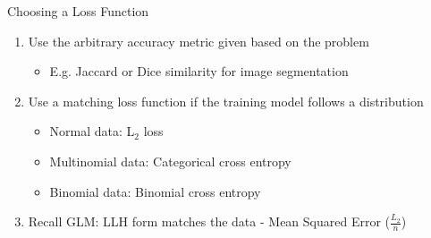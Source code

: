 \documentclass[aspectratio=169]{beamer}
\begin{document}
%
\begin{frame}{Choosing a Loss Function}

\begin{enumerate}
\item Use the arbitrary accuracy metric given based on the problem
	\begin{itemize}
	\item E.g. Jaccard or Dice similarity for image segmentation
	\end{itemize}
\item Use a matching loss function if the training model follows a distribution
	\begin{itemize}
	\item Normal data: L$_2$ loss
	\item Multinomial data: Categorical cross entropy
	\item Binomial data: Binomial cross entropy
	\end{itemize}
\item Recall GLM: LLH form matches the data - Mean Squared Error \Big($\frac{L_2}{n}$\Big)
\end{enumerate}
\end{frame}
\end{document}
